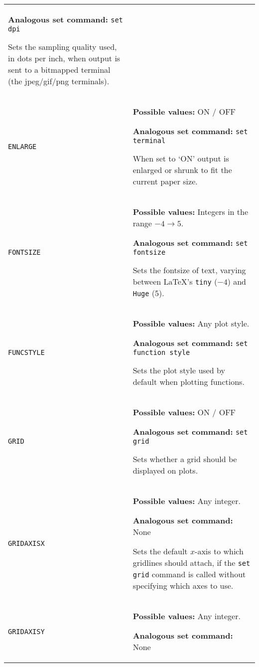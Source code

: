 \begin{longtable}{p{3.4cm}p{9cm}}
                   {\bf Analogous set command:} {\tt set dpi}\index{set dpi command@{\tt set dpi} command}

                   Sets the sampling quality used, in dots per inch, when output is sent to a bitmapped terminal (the jpeg/gif/png terminals).
                   \\
{\tt ENLARGE} & {\bf Possible values:} ON / OFF

                   {\bf Analogous set command:} {\tt set terminal}\index{set terminal command@{\tt set terminal} command}
                   
                   When set to `ON' output is enlarged or shrunk to fit the
                   current paper size.
                   \\

{\tt FONTSIZE} & {\bf Possible values:} Integers in the range $-4 \to 5$.

                   {\bf Analogous set command:} {\tt set fontsize}\index{set fontsize command@{\tt set fontsize} command}

                   Sets the fontsize of text, varying between \LaTeX's {\tt tiny} ($-4$) and {\tt Huge} (5).
                   \\
{\tt FUNCSTYLE} & {\bf Possible values:} Any plot style.

                   {\bf Analogous set command:} {\tt set function style}\index{set function style command@{\tt set function style} command}

                   Sets the plot style used by default when plotting functions.
                   \\
{\tt GRID} & {\bf Possible values:} ON / OFF

                   {\bf Analogous set command:} {\tt set grid}\index{set grid command@{\tt set grid} command}

                   Sets whether a grid should be displayed on plots.
                   \\
{\tt GRIDAXISX} & {\bf Possible values:} Any integer.

                   {\bf Analogous set command:} None

                   Sets the default $x$-axis to which gridlines should attach, if the {\tt set grid} command is called without specifying which axes to use.
                   \\
{\tt GRIDAXISY} & {\bf Possible values:} Any integer.

                   {\bf Analogous set command:} None


\end{longtable}
